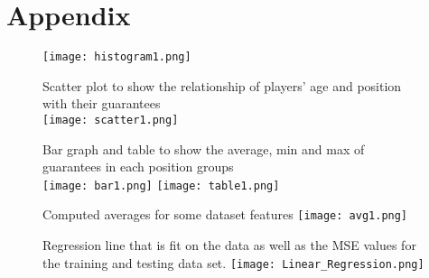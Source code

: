 \documentclass{article}
\begin{document}
\section{Appendix}
    \label{sec:Appendix}
    \begin{figure}[h]
        \centering
        \caption{}
        \texttt{[image: histogram1.png]}
    \end{figure}
    
     \begin{figure}[h]
     \centering
        \caption{}
        Scatter plot to show the relationship of players' age and position with their guarantees\\
        \texttt{[image: scatter1.png]}
     \end{figure}
     
     
    
     \begin{figure}[h]
        \centering
        \caption{}
        Bar graph and table to show the average, min and max of guarantees in each position groups\\
        \texttt{[image: bar1.png]}
        \texttt{[image: table1.png]}
    \end{figure}
    
    
    \begin{figure}[h]
        \centering
        \caption{}
        Computed averages for some dataset features
        \texttt{[image: avg1.png]}
    \end{figure}
    
    \begin{figure}[h]
    \centering
        \caption{}
        Regression line that is fit on the data as well as the MSE values for the training and testing data set. 
        \texttt{[image: Linear\_Regression.png]}
    \end{figure}
\end{document}
